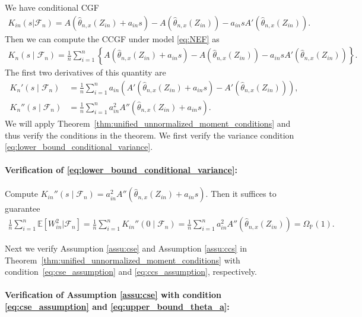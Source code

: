 \documentclass[12pt]{article}
\theoremstyle{definition}
\def\P{\mathbb{P}}
\def\P{\mathbb{P}}
\newcommand{\E}{\mathbb E}								%
\renewcommand{\P}{\mathbb{P}}							%
\newcommand{\srz}{Z}									%
\begin{document}
We have conditional CGF 
\begin{align*}
	K_{in}(s|\mathcal{F}_n) = A(\widehat \theta_{n,x}(\srz_{in})+a_{in}s)-A(\widehat \theta_{n,x}(\srz_{in}))-a_{in}sA'(\widehat \theta_{n,x}(\srz_{in})).
\end{align*}
Then we can compute the CCGF under model \eqref{eq:NEF} as
\begin{align*}
	K_n(s \mid \mathcal F_n) = \frac{1}{n}\sum_{i = 1}^n \left\{A(\widehat \theta_{n,x}(\srz_{in})+a_{in}s)-A(\widehat \theta_{n,x}(\srz_{in}))-a_{in}sA'(\widehat \theta_{n,x}(\srz_{in}))\right\}.
\end{align*}
The first two derivatives of this quantity are
\begin{align}
  K_n'(s \mid \mathcal F_n) &= \frac{1}{n}\sum_{i = 1}^n a_{in}\left(A'(\widehat \theta_{n,x}(\srz_{in})+a_{in}s)-A'(\widehat \theta_{n,x}(\srz_{in}))\right), \label{eq:conditional-cgf-derivative} \\
  K_n''(s \mid \mathcal F_n) &= \frac{1}{n}\sum_{i = 1}^n a_{in}^2A''(\widehat \theta_{n,x}(\srz_{in})+a_{in}s). \label{eq:conditional-cgf-second-derivative}
\end{align}
We will apply Theorem~\ref{thm:unified_unnormalized_moment_conditions} and thus verify the conditions in the theorem. We first verify the variance condition \eqref{eq:lower_bound_conditional_variance}.

\paragraph{\textbf{Verification of \eqref{eq:lower_bound_conditional_variance}}:}
Compute $K_{in}''(s\mid \mathcal{F}_n)= a_{in}^2A''(\widehat \theta_{n,x}(\srz_{in})+a_{in}s)$. Then it suffices to guarantee 
\begin{align*}
  \frac{1}{n}\sum_{i=1}^n \E[W_{in}^2|\mathcal{F}_n]=\frac{1}{n}\sum_{i=1}^n K_{in}''(0\mid \mathcal{F}_n)=\frac{1}{n}\sum_{i=1}^n a_{in}^2A''(\widehat \theta_{n,x}(\srz_{in}))=\Omega_\P(1).
\end{align*}

\noindent Next we verify Assumption \ref{assu:cse} and Assumption \ref{assu:ccs} in Theorem~\ref{thm:unified_unnormalized_moment_conditions} with condition~\eqref{eq:cse_assumption} and \eqref{eq:ccs_assumption}, respectively.

\paragraph{Verification of Assumption \ref{assu:cse} with condition \eqref{eq:cse_assumption} and \eqref{eq:upper_bound_theta_a}:} 
\end{document}
